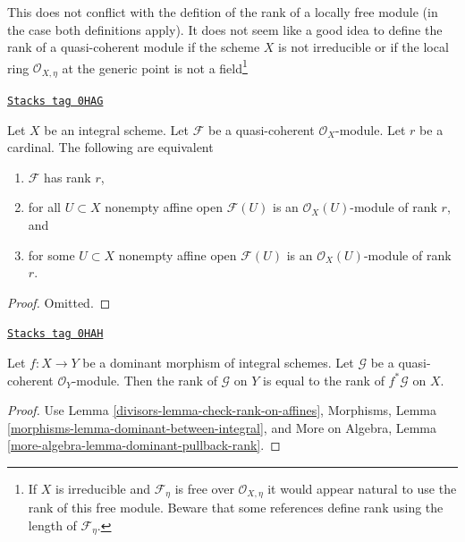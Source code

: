 This does not conflict with the defition of the rank of a locally free module
(in the case both definitions apply). It does not seem like a good idea
to define the rank of a quasi-coherent module if the scheme $X$
is not irreducible or if the local ring $\mathcal{O}_{X, \eta}$
at the generic point is not a field\footnote{If $X$ is irreducible and
$\mathcal{F}_\eta$ is free over $\mathcal{O}_{X, \eta}$ it would appear
natural to use the rank of this free module. Beware that some references
define rank using the length of $\mathcal{F}_\eta$.}

\begin{lemma}
\label{divisors-lemma-check-rank-on-affines}
\href{https://stacks.math.columbia.edu/tag/0HAG}{\texttt{Stacks tag 0HAG}}

Let $X$ be an integral scheme. Let $\mathcal{F}$ be a quasi-coherent
$\mathcal{O}_X$-module. Let $r$ be a cardinal. The following are equivalent
\begin{enumerate}
\item $\mathcal{F}$ has rank $r$,
\item for all $U \subset X$ nonempty affine open $\mathcal{F}(U)$
is an $\mathcal{O}_X(U)$-module of rank $r$, and
\item for some $U \subset X$ nonempty affine open $\mathcal{F}(U)$
is an $\mathcal{O}_X(U)$-module of rank $r$.
\end{enumerate}
\end{lemma}

\begin{proof}
Omitted.
\end{proof}

\begin{lemma}
\label{divisors-lemma-dominant-pullback-rank}
\href{https://stacks.math.columbia.edu/tag/0HAH}{\texttt{Stacks tag 0HAH}}

Let $f : X \to Y$ be a dominant morphism of integral schemes.
Let $\mathcal{G}$ be a quasi-coherent $\mathcal{O}_Y$-module.
Then the rank of $\mathcal{G}$ on $Y$ is equal to the rank
of $f^*\mathcal{G}$ on $X$.
\end{lemma}

\begin{proof}

Use Lemma \ref{divisors-lemma-check-rank-on-affines},
Morphisms, Lemma \ref{morphisms-lemma-dominant-between-integral},
and
More on Algebra, Lemma \ref{more-algebra-lemma-dominant-pullback-rank}.
\end{proof}

